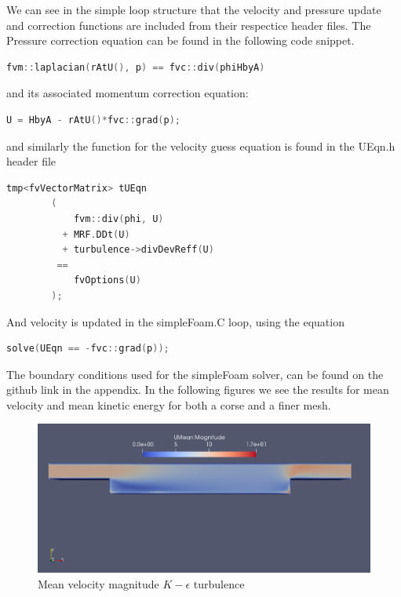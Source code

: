 \documentclass[paper=a4, fontsize=11pt]{article} %
\numberwithin{equation}{section} %
\numberwithin{figure}{section} %
\numberwithin{table}{section} %
\begin{document}
    We can see in the simple loop structure that the velocity and pressure update and correction functions are included from their respectice header files. The Pressure correction equation can be found in the following code snippet.
    
    \begin{lstlisting}[language=C++]
        fvm::laplacian(rAtU(), p) == fvc::div(phiHbyA)
    \end{lstlisting}
    
    and its associated momentum correction equation:

    \begin{lstlisting}[language=C++]
        U = HbyA - rAtU()*fvc::grad(p);
    \end{lstlisting}

    and similarly the function for the velocity guess equation is found in the UEqn.h header file 
    
    \begin{lstlisting}[language=C++]
        tmp<fvVectorMatrix> tUEqn
        (
            fvm::div(phi, U)
          + MRF.DDt(U)
          + turbulence->divDevReff(U)
         ==
            fvOptions(U)
        );
    \end{lstlisting}

    And velocity is updated in the simpleFoam.C loop, using the equation

    \begin{lstlisting}[language=C++]
        solve(UEqn == -fvc::grad(p));
    \end{lstlisting}

    The boundary conditions used for the simpleFoam solver, can be found on the github link in the appendix. 
    In the following figures we see the results for mean velocity and mean kinetic energy for both a corse and a finer mesh.

    \begin{figure}[h]
        \centering
        \includegraphics[width=0.6\linewidth]{Figures/simple_U_mean}
        \caption{Mean velocity magnitude $K - \epsilon$ turbulence}
        \label{fig:MeanUSimple}
    \end{figure}
\end{document}
